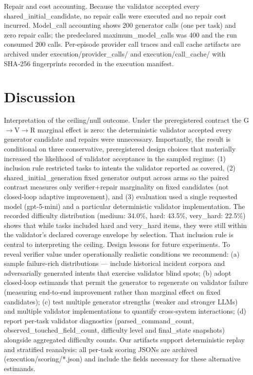 \documentclass[conference]{IEEEtran}
\begin{document}
Repair and cost accounting. Because the validator accepted every shared\_initial\_candidate, no repair calls were executed and no repair cost incurred. Model\_call accounting shows 200 generator calls (one per task) and zero repair calls; the predeclared maximum\_model\_calls was 400 and the run consumed 200 calls. Per‑episode provider call traces and call cache artifacts are archived under execution/provider\_calls/ and execution/call\_cache/ with SHA‑256 fingerprints recorded in the execution manifest.

\section{Discussion}
Interpretation of the ceiling/null outcome. Under the preregistered contract the G\ensuremath{\rightarrow}V\ensuremath{\rightarrow}R marginal effect is zero: the deterministic validator accepted every generator candidate and repairs were unnecessary. Importantly, the result is conditional on three conservative, preregistered design choices that materially increased the likelihood of validator acceptance in the sampled regime: (1) inclusion rule restricted tasks to intents the validator reported as covered, (2) shared\_initial\_generation fixed generator output across arms so the paired contrast measures only verifier+repair marginality on fixed candidates (not closed‑loop adaptive improvement), and (3) evaluation used a single requested model (gpt-5-mini) and a particular deterministic validator implementation. The recorded difficulty distribution (medium: 34.0\%, hard: 43.5\%, very\_hard: 22.5\%) shows that while tasks included hard and very\_hard items, they were still within the validator's declared coverage envelope by selection. That inclusion rule is central to interpreting the ceiling.
Design lessons for future experiments. To reveal verifier value under operationally realistic conditions we recommend: (a) sample failure‑rich distributions --- include historical incident corpora and adversarially generated intents that exercise validator blind spots; (b) adopt closed‑loop estimands that permit the generator to regenerate on validator failure (measuring end‑to‑end improvement rather than marginal effect on fixed candidates); (c) test multiple generator strengths (weaker and stronger LLMs) and multiple validator implementations to quantify cross‑system interactions; (d) report per‑task validator diagnostics (parsed\_command\_count, observed\_touched\_field\_count, difficulty level and final\_state snapshots) alongside aggregated difficulty counts. Our artifacts support deterministic replay and stratified reanalysis: all per‑task scoring JSONs are archived (execution/scoring/*.json) and include the fields necessary for these alternative estimands.
\end{document}

